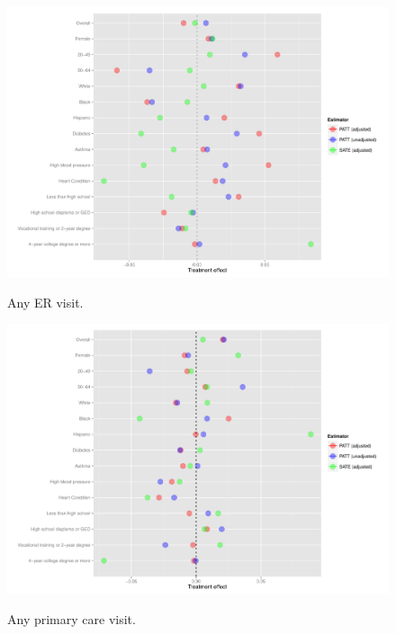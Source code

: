 \documentclass{beamer}
\begin{document}
\begin{frame}
\begin{figure}[htbp]
\begin{center}
       \caption{Any ER visit.}
   \includegraphics[scale=0.35]{../paper/any-visit-plot.pdf} 
   \label{het-plot-av}
   \end{center}
\end{figure}
\end{frame}

\begin{frame}
\begin{figure}[htbp]
\begin{center}
    \caption{Any primary care visit.}
   \includegraphics[scale=0.35]{../paper/any-out-plot.pdf} 
   \label{het-plot-ao}
   \end{center}
\end{figure}
\end{frame}
\end{document}
